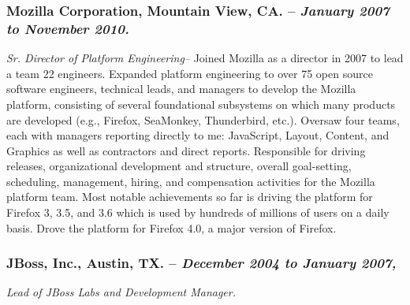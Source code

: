 \documentclass[10pt]{report}
\begin{document}
\subsubsection*{Mozilla Corporation, Mountain View, CA. -- \emph{January 2007
to November 2010. }} \emph{Sr. Director of Platform Engineering--} Joined
Mozilla as a director in 2007 to lead a team 22 engineers.  Expanded platform
engineering to over 75 open source software engineers, technical leads, and
managers to develop the Mozilla platform, consisting of several foundational
subsystems on which many products are developed (e.g., Firefox, SeaMonkey,
Thunderbird, etc.).  Oversaw four teams, each with managers reporting directly
to me:  JavaScript, Layout, Content, and Graphics as well as contractors and
direct reports.  Responsible for driving releases, organizational development
and structure, overall goal-setting, scheduling, management, hiring, and
compensation activities for the Mozilla platform team.  Most notable
achievements so far is driving the platform for Firefox 3, 3.5, and 3.6 which
is used by hundreds of millions of users on a daily basis.  Drove the platform
for Firefox 4.0, a major version of Firefox.


\subsubsection*{JBoss, Inc., Austin, TX. -- \emph{December 2004 to January
2007, }} \emph{Lead of JBoss Labs and Development Manager.}

\end{document}
